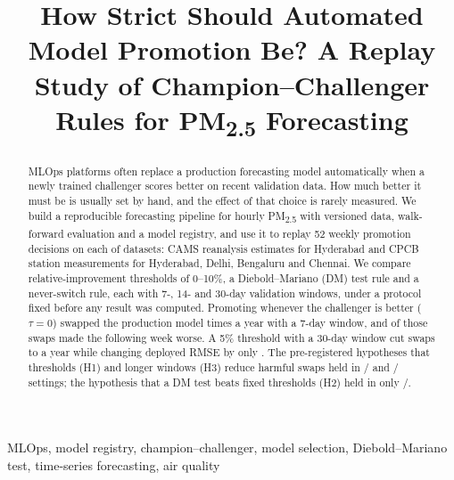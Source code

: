 \documentclass[conference]{IEEEtran}
\newif\ifextended
\begin{document}
\title{How Strict Should Automated Model Promotion Be?
A Replay Study of Champion--Challenger Rules for PM\textsubscript{2.5} Forecasting%
\ifextended\\ {\large (Extended Version)}\fi}

\author{
}

\maketitle

\begin{abstract}
MLOps platforms often replace a production forecasting model automatically when a newly trained
challenger scores better on recent validation data. How much better it must be is usually set by
hand, and the effect of that choice is rarely measured. We build a reproducible forecasting
pipeline for hourly PM\textsubscript{2.5} with versioned data, walk-forward evaluation and a model
registry, and use it to replay 52 weekly promotion decisions on each of  datasets:
CAMS reanalysis estimates for Hyderabad and CPCB station measurements for Hyderabad, Delhi,
Bengaluru and Chennai. We compare relative-improvement thresholds of 0--10\%, a Diebold--Mariano
(DM) test rule and a never-switch rule, each with 7-, 14- and 30-day validation windows, under a
protocol fixed before any result was computed. Promoting whenever the challenger is better
(\(\tau=0\)) swapped the production model  times a year with a 7-day window,
and  of those swaps made the following week worse. A 5\% threshold
with a 30-day window cut swaps to  a year while changing deployed RMSE by
only . The pre-registered hypotheses that thresholds (H1) and longer
windows (H3) reduce harmful swaps held in / and /
settings; the hypothesis that a DM test beats fixed thresholds (H2) held in only
/.
\end{abstract}

\begin{IEEEkeywords}
MLOps, model registry, champion--challenger, model selection, Diebold--Mariano test,
time-series forecasting, air quality
\end{IEEEkeywords}

\end{document}
